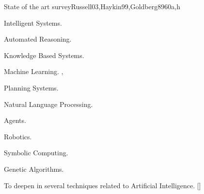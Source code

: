 \begin{syllabus}
\begin{unit}{}{State of the art survey}{Russell03,Haykin99,Goldberg89}{60}{a,h}
\begin{topics}
  \item Intelligent Systems.
  \item Automated Reasoning.
  \item Knowledge Based Systems.
  \item Machine Learning. \cite{Russell03},\cite{Haykin99}
  \item Planning Systems.
  \item Natural Language Processing.
  \item Agents.
  \item Robotics.
  \item Symbolic Computing.
  \item Genetic Algorithms. \cite{Goldberg89}
\end{topics}
\begin{learningoutcomes}
  \item To deepen in several techniques related to Artificial Intelligence. [\Usage]
\end{learningoutcomes}
\end{unit}

\begin{coursebibliography}
\end{coursebibliography}

\end{syllabus}
